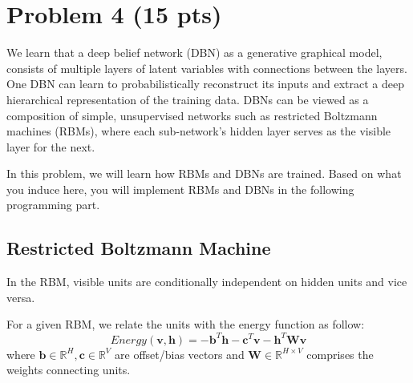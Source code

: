 \section*{Problem 4 (15 pts)}

We learn that a deep belief network (DBN) as a generative graphical model, consists of multiple layers of latent variables with connections between the layers. 
One DBN can learn to probabilistically reconstruct its inputs and extract a deep hierarchical representation of the training data. 
DBNs can be viewed as a composition of simple, unsupervised networks such as restricted Boltzmann machines (RBMs), where each sub-network's hidden layer serves as the visible layer for the next.

In this problem, we will learn how RBMs and DBNs are trained.
Based on what you induce here, you will implement RBMs and DBNs in the following programming part.

\subsection*{Restricted Boltzmann Machine}
In the RBM, visible units are conditionally independent on hidden units and vice versa. 

\begin{center}
\end{center}

For a given RBM, we relate the units with the energy function as follow: 
    \[Energy(\textbf{v},\textbf{h}) = -\textbf{b}^{T}\textbf{h} - \textbf{c}^{T}\textbf{v}-\textbf{h}^{T}\textbf{W}\textbf{v}\] 
where $\textbf{b} \in \mathbb{R}^{H}, \textbf{c} \in \mathbb{R}^{V}$ are offset/bias vectors and $\textbf{W} \in \mathbb{R}^{H\times V}$ comprises the weights connecting units.

